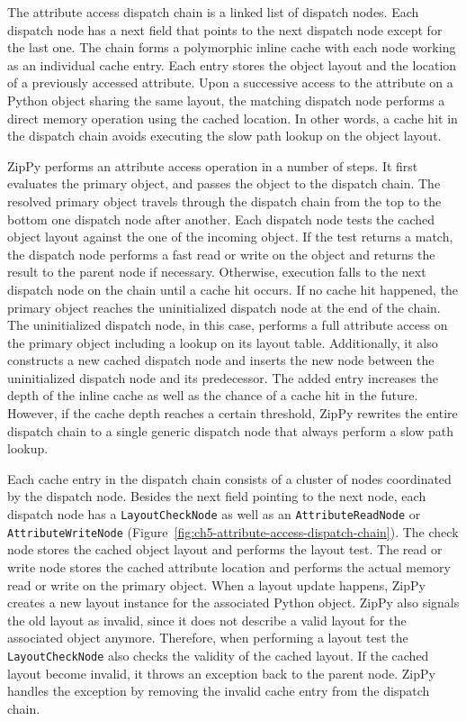 The attribute access dispatch chain is a linked list of dispatch nodes.
Each dispatch node has a \textsf{next} field that points to the next dispatch node except for the last one.
The chain forms a polymorphic inline cache with each node working as an individual cache entry.
Each entry stores the object layout and the location of a previously accessed attribute.
Upon a successive access to the attribute on a Python object sharing the same layout, the matching dispatch node performs a direct memory operation using the cached location.
In other words, a cache hit in the dispatch chain avoids executing the slow path lookup on the object layout.

ZipPy performs an attribute access operation in a number of steps.
It first evaluates the primary object, and passes the object to the dispatch chain.
The resolved primary object travels through the dispatch chain from the top to the bottom one dispatch node after another.
Each dispatch node tests the cached object layout against the one of the incoming object.
If the test returns a match, the dispatch node performs a fast read or write on the object and returns the result to the parent node if necessary.
Otherwise, execution falls to the next dispatch node on the chain until a cache hit occurs.
If no cache hit happened, the primary object reaches the uninitialized dispatch node at the end of the chain.
The uninitialized dispatch node, in this case, performs a full attribute access on the primary object including a lookup on its layout table.
Additionally, it also constructs a new cached dispatch node and inserts the new node between the uninitialized dispatch node and its predecessor.
The added entry increases the depth of the inline cache as well as the chance of a cache hit in the future.
However, if the cache depth reaches a certain threshold, ZipPy rewrites the entire dispatch chain to a single generic dispatch node that always perform a slow path lookup.

Each cache entry in the dispatch chain consists of a cluster of nodes coordinated by the dispatch node.
Besides the \textsf{next} field pointing to the next node, each dispatch node has a \texttt{LayoutCheckNode} as well as an \texttt{AttributeReadNode} or \texttt{AttributeWriteNode} (Figure~\ref{fig:ch5-attribute-access-dispatch-chain}).
The \textsf{check} node stores the cached object layout and performs the layout test.
The \textsf{read} or \textsf{write} node stores the cached attribute location and performs the actual memory read or write on the primary object.
When a layout update happens, ZipPy creates a new layout instance for the associated Python object.
ZipPy also signals the old layout as invalid, since it does not describe a valid layout for the associated object anymore.
Therefore, when performing a layout test the \texttt{LayoutCheckNode} also checks the validity of the cached layout.
If the cached layout become invalid, it throws an exception back to the parent node.
ZipPy handles the exception by removing the invalid cache entry from the dispatch chain.

